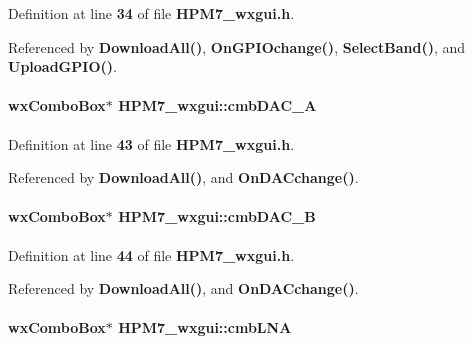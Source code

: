 Definition at line {\bf 34} of file {\bf H\+P\+M7\+\_\+wxgui.\+h}.



Referenced by {\bf Download\+All()}, {\bf On\+G\+P\+I\+Ochange()}, {\bf Select\+Band()}, and {\bf Upload\+G\+P\+I\+O()}.

\paragraph[{cmb\+D\+A\+C\+\_\+A}]{\setlength{\rightskip}{0pt plus 5cm}wx\+Combo\+Box$\ast$ H\+P\+M7\+\_\+wxgui\+::cmb\+D\+A\+C\+\_\+A\hspace{0.3cm}{\ttfamily [protected]}}\label{classHPM7__wxgui_aca1552659b0f5552a1f877d709124243}


Definition at line {\bf 43} of file {\bf H\+P\+M7\+\_\+wxgui.\+h}.



Referenced by {\bf Download\+All()}, and {\bf On\+D\+A\+Cchange()}.

\paragraph[{cmb\+D\+A\+C\+\_\+B}]{\setlength{\rightskip}{0pt plus 5cm}wx\+Combo\+Box$\ast$ H\+P\+M7\+\_\+wxgui\+::cmb\+D\+A\+C\+\_\+B\hspace{0.3cm}{\ttfamily [protected]}}\label{classHPM7__wxgui_ad5dbab74b5366cd45fbd5bf02502707b}


Definition at line {\bf 44} of file {\bf H\+P\+M7\+\_\+wxgui.\+h}.



Referenced by {\bf Download\+All()}, and {\bf On\+D\+A\+Cchange()}.

\paragraph[{cmb\+L\+NA}]{\setlength{\rightskip}{0pt plus 5cm}wx\+Combo\+Box$\ast$ H\+P\+M7\+\_\+wxgui\+::cmb\+L\+NA\hspace{0.3cm}{\ttfamily [protected]}}\label{classHPM7__wxgui_a2fff149b18482f1f44e00f6c77dac942}


